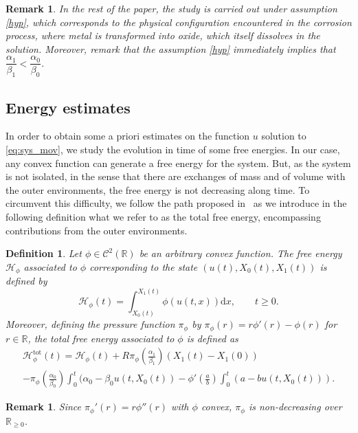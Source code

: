 \documentclass{amsart}
\newcommand\R{\mathbb{R}}
\renewcommand\H{\mathcal{H}_{\phi}}
\newcommand\intmov{\int_{X_0(t)}^{X_1(t)}}
\newtheorem{remark}[theorem]{Remark}
\newtheorem{definition}{Definition}
\begin{document}
	\begin{remark}
		In the rest of the paper, the study is carried out under assumption \eqref{hyp}, which corresponds to the physical configuration encountered in the 
		corrosion process, where metal is transformed into oxide, which itself dissolves in the solution.
Moreover, remark that the assumption \eqref{hyp} immediately implies that $\dfrac{\alpha_1}{\beta_1} < \dfrac{\alpha_0}{\beta_0}$.
	\end{remark}
	\subsection{Energy estimates}
	In order to obtain some a priori estimates on the function $u$ solution to \eqref{eq:sys_mov}, we study the evolution in time of some free energies. In our case, any convex function can generate a free energy for the system. But, as the system is not isolated, in the sense that 
	there are exchanges of mass and of volume with the outer environments, the free energy is not decreasing along time. To circumvent this difficulty, we 
	follow the path proposed in~\cite{Cances_ZAMP} as 
	we introduce in the following definition what we refer to as the total free energy, encompassing contributions from the outer environments. 
	\begin{definition}
	Let $\phi \in \mathcal{C}^2(\R)$ be an arbitrary convex function. The free energy $\H$ associated to $\phi$ corresponding to the state $(u(t), X_0(t), X_1(t))$ is defined by
	\begin{equation}\label{eq:H}
	\H(t) = \intmov \phi(u(t,x)) {\text{d}x}, \qquad t \geq 0. 
	\end{equation}
	Moreover, defining the pressure function $\pi_\phi$ by $\pi_\phi(r) = r \phi'(r) - \phi(r)$ for $r \in \R$, the total free energy associated to $\phi$ is defined as
		\begin{multline}
			\H^{\text{tot}}(t) = \H(t) + R\pi_\phi\left(\frac{\alpha_1}{\beta_1}\right) (X_1(t)-X_1(0)) \\
			- \pi_\phi\left(\frac{\alpha_0}{\beta_0}\right) \int_0^t (\alpha_0-\beta_0 u(t,X_0(t)) - \phi'\left(\frac{a}{b}\right) \int_0^t (a - b u(t, X_0(t))).
		\end{multline}
	\end{definition}
	\noindent
	\begin{remark} \label{rk:pi_croiss}
		Since $\pi_\phi'(r) = r \phi''(r)$ with $\phi$ convex, $\pi_\phi$ is non-decreasing over $\R_{\geq 0}$.
	\end{remark}
\end{document}
